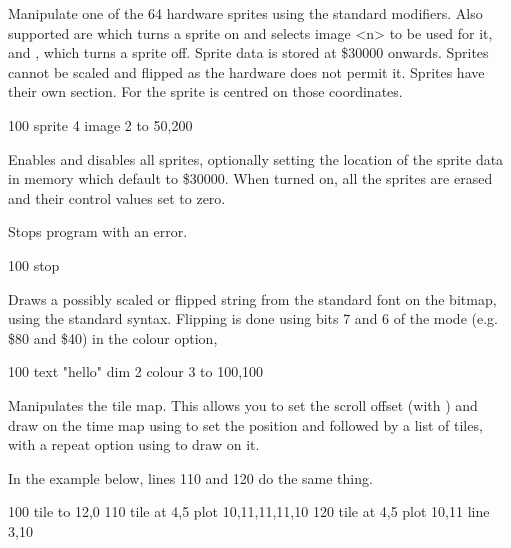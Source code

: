 \begin{entry}
Manipulate one of the 64 hardware sprites using the standard modifiers. Also supported are  which turns a sprite on and selects image <n> to be used for it, and , which turns a sprite off. Sprite data is stored at \$30000 onwards. Sprites cannot be scaled and flipped as the hardware does not permit it. Sprites have their own section. For  the sprite is centred on those coordinates.

\begin{lstexample}
100 sprite 4 image 2 to 50,200
\end{lstexample}
\end{entry}

\begin{entry}
Enables and disables all sprites, optionally setting the location of the sprite data in memory which default to \$30000. When turned on, all the sprites are erased and their control values set to zero.

\end{entry}

\begin{entry}
Stops program with an error.

\begin{lstexample}
100 stop
\end{lstexample}
\end{entry}

\begin{entry}
Draws a possibly scaled or flipped string from the standard font on the bitmap, using the standard syntax. Flipping is done using bits 7 and 6 of the mode (e.g. \$80 and \$40) in the colour option,

\begin{lstexample}
100 text "hello" dim 2 colour 3 to 100,100
\end{lstexample}
\end{entry}

\begin{entry}
Manipulates the tile map. This allows you to set the scroll offset (with ) and draw on the time map using  to set the position and  followed by a list of tiles, with a repeat option using  to draw on it. 

In the example below, lines 110 and 120 do the same thing.

\begin{lstexample}
100 tile to 12,0
110 tile at 4,5 plot 10,11,11,11,10
120 tile at 4,5 plot 10,11 line 3,10
\end{lstexample}
\end{entry}

